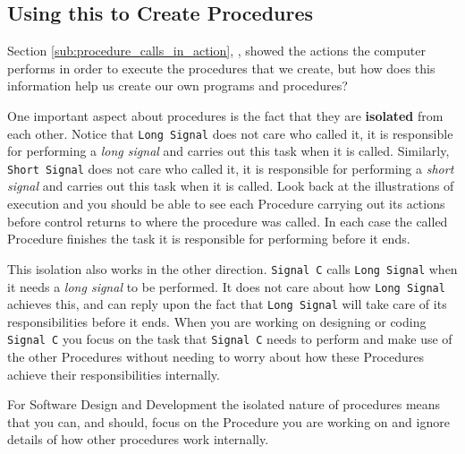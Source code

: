 
\clearpage
\subsection{Using this to Create Procedures} %
\label{sub:using_this_to_create_procedures}

Section \ref{sub:procedure_calls_in_action}, , showed the actions the computer performs in order to execute the procedures that we create, but how does this information help us create our own programs and procedures?

One important aspect about procedures is the fact that they are \textbf{isolated} from each other. Notice that \texttt{Long Signal} does not care who called it, it is responsible for performing a \emph{long signal} and carries out this task when it is called. Similarly, \texttt{Short Signal} does not care who called it, it is responsible for performing a \emph{short signal} and carries out this task when it is called. Look back at the illustrations of execution and you should be able to see each Procedure carrying out its actions before control returns to where the procedure was called. In each case the called Procedure finishes the task it is responsible for performing before it ends.

This isolation also works in the other direction. \texttt{Signal C} calls \texttt{Long Signal} when it needs a \emph{long signal} to be performed. It does not care about how \texttt{Long Signal} achieves this, and can reply upon the fact that \texttt{Long Signal} will take care of its responsibilities before it ends. When you are working on designing or coding \texttt{Signal C} you focus on the task that \texttt{Signal C} needs to perform and make use of the other Procedures without needing to worry about how these Procedures achieve their responsibilities internally.

For Software Design and Development the isolated nature of procedures means that you can, and should, focus on the Procedure you are working on and ignore details of how other procedures work internally. 



